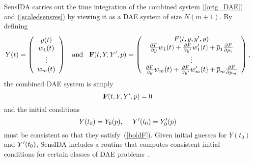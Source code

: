 SensIDA carries out the time integration of the combined system
(\ref{orig_DAE}) and (\ref{scaledsensres}) by viewing it as a DAE system
of size $N(m+1)$.
By defining
\[
Y(t) = \left( \begin{array}{c}
y(t) \\ w_1(t) \\ \vdots \\ w_m(t) \end{array} \right)
\;\; \mbox{ and } \; \;
{\bf F}(t, Y, Y^{\prime}, p) =  \left( \begin{array}{c}
F(t, y, y^{\prime}, p) \\ 
\frac{\partial F}{\partial y} w_1(t) + \frac{\partial F}{\partial y^{\prime}} w^{\prime}_{1}(t) + \overline{p}_1 \frac{\partial F}{\partial p_1} \\ 
\vdots \\ 
\frac{\partial F}{\partial y} w_m(t) + \frac{\partial F}{\partial y^{\prime}} w^{\prime}_{m}(t) + \overline{p}_m \frac{\partial F}{\partial p_m} 
\end{array} \right),
\]
the combined DAE system is simply
\begin{equation}
{{\bf F}}(t,Y,Y^{\prime},p)=0
\label{boldF}
\end{equation}
and the initial conditions
\[
Y(t_0) = Y_0(p),~~~\; Y^{\prime}(t_0) = Y^{\prime}_0(p)
\]
must be consistent so that they satisfy~(\ref{boldF}).
Given initial guesses for $Y(t_0)$ and $Y^{\prime}(t_0)$, SensIDA
includes a routine that computes consistent initial conditions for
certain classes of DAE problems~\cite{BHP98}.

